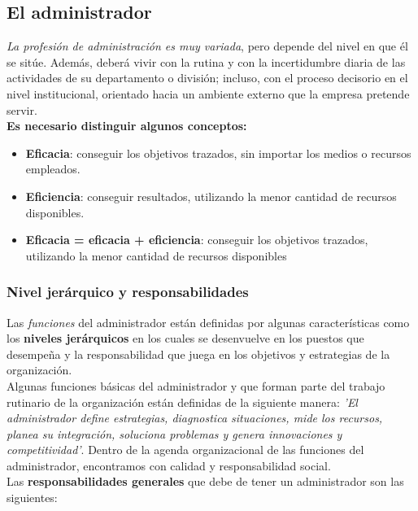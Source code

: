\documentclass[letterpaper,12pt]{article}
\begin{document}
\begin{sloppypar}
\subsection{El administrador}
\textit{La profesión de administración es muy variada}, pero depende del nivel en que él se sitúe. Además, deberá vivir con la rutina y con la incertidumbre diaria de las actividades de su departamento o división; incluso, con el proceso decisorio en el nivel institucional, orientado hacia un ambiente externo que la empresa pretende servir.
\vspace{0.3cm}\\ 
\textbf{Es necesario distinguir algunos conceptos:}
\begin{itemize}
    \item \textbf{Eficacia}: conseguir los objetivos trazados, sin importar los medios o recursos empleados.
    \item \textbf{Eficiencia}: conseguir resultados, utilizando la menor cantidad de recursos disponibles.
    \item \textbf{Eficacia = eficacia + eficiencia}: conseguir los objetivos trazados, utilizando la menor cantidad de recursos disponibles 
\end{itemize}
\subsubsection{Nivel jerárquico y responsabilidades}
Las \textit{funciones} del administrador están definidas por algunas características como los \textbf{niveles jerárquicos} en los cuales se desenvuelve en los puestos que desempeña y la responsabilidad que juega en los objetivos y estrategias de la organización.
\vspace{0.3cm}\\
Algunas funciones básicas del administrador y que forman parte del trabajo rutinario de la organización están definidas de la siguiente manera: \textit{'El administrador define estrategias, diagnostica situaciones, mide los recursos, planea su integración, soluciona problemas y genera innovaciones y competitividad'}. Dentro de la agenda organizacional de las funciones del administrador, encontramos con calidad y responsabilidad social. 
\vspace{0.3cm}\\ 
Las \textbf{responsabilidades generales }que debe de tener un administrador son las siguientes:


\end{sloppypar}
\end{document}
